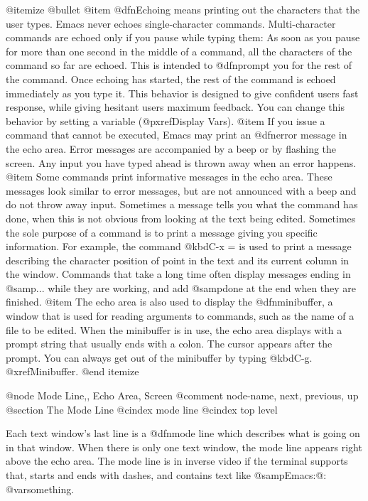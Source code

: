@itemize @bullet
@item
  @dfn{Echoing} means printing out the characters that the user types.  Emacs
never echoes single-character commands.  Multi-character commands are
echoed only if you pause while typing them: As soon as you pause for more
than one second in the middle of a command, all the characters of the command
so far are echoed.  This is intended to @dfn{prompt} you for the rest of
the command.  Once echoing has started, the rest of the command is echoed
immediately as you type it.  This behavior is designed to give confident
users fast response, while giving hesitant users maximum feedback.  You
can change this behavior by setting a variable (@pxref{Display Vars}).
@item
  If you issue a command that cannot be executed, Emacs may print an
@dfn{error message} in the echo area.  Error messages are accompanied by
a beep or by flashing the screen.  Any input you have typed ahead is
thrown away when an error happens.
@item
  Some commands print informative messages in the echo area.  These
messages look similar to error messages, but are not announced with a
beep and do not throw away input.  Sometimes a message tells you what the
command has done, when this is not obvious from looking at the text being
edited.  Sometimes the sole purpose of a command is to print a message
giving you specific information.  For example, the command @kbd{C-x =} is
used to print a message describing the character position of point in the
text and its current column in the window.  Commands that take a long time
often display messages ending in @samp{...} while they are working, and
add @samp{done} at the end when they are finished.
@item
  The echo area is also used to display the @dfn{minibuffer}, a window
that is used for reading arguments to commands, such as the name of a
file to be edited.  When the minibuffer is in use, the echo area displays
with a prompt string that usually ends with a colon.  The cursor
appears after the prompt.  You can always get out of the minibuffer by
typing @kbd{C-g}.  @xref{Minibuffer}.
@end itemize

@node Mode Line,, Echo Area, Screen
@comment  node-name,  next,  previous,  up
@section The Mode Line
@cindex mode line
@cindex top level

  Each text window's last line is a @dfn{mode line} which describes what is
going on in that window.  When there is only one text window, the mode line
appears right above the echo area.  The mode line is in inverse video if
the terminal supports that, starts and ends with dashes, and contains text
like @samp{Emacs:@: @var{something}}.

